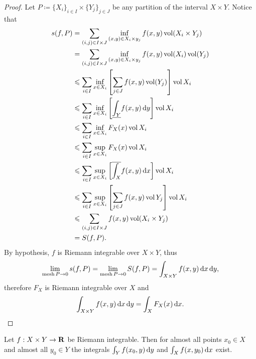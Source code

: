 \begin{proof}
    Let \(P \coloneq \{X_{i}\}_{i \in I} \times \{Y_{j}\}_{j \in J}\) be any
    partition of the interval \(X \times Y\). Notice that
    \begin{align*}
        s(f, P)
         & = \sum_{(i, j) \in I \times J}
        \inf_{(x, y) \in X_i \times y_j}f(x, y) \operatorname{vol}(X_i \times Y_j)                     \\
         & = \sum_{(i, j) \in I \times J}
        \inf_{(x, y) \in X_i \times y_j}f(x, y) \operatorname{vol}(X_i) \operatorname{vol}(Y_j)                      \\
         & \leqslant \sum_{i \in I}
        \inf_{x \in X_i} \left[ \sum_{j \in J} f(x, y) \operatorname{vol}(Y_j) \right] \operatorname{vol} X_i        \\
         & \leqslant \sum_{i \in I} \inf_{x \in X_i} \left[ \underline{\int_{Y}} f(x, y)\,
        \mathrm{d} y \right] \operatorname{vol} X_i                                                         \\
         & \leqslant \sum_{i \in I} \inf_{x \in X_i} F_X(x) \operatorname{vol} X_i                          \\
         & \leqslant \sum_{i \in I} \sup_{x \in X_i} F_X(x) \operatorname{vol} X_i                          \\
         & \leqslant \sum_{i \in I} \sup_{x \in X_i} \left[ \overline{\int_X} f(x, y)\, \mathrm{d}
        x \right] \operatorname{vol} X_i                                                               \\
         & \leqslant \sum_{i \in I} \sup_{x \in X_i} \left[ \sum_{j \in J} f(x, y) \operatorname{vol} Y_j
        \right] \operatorname{vol} X_i                                                                 \\
         & \leqslant \sum_{(i, j) \in I \times J} f(x, y) \operatorname{vol}(X_i \times Y_j)                \\
         & = S(f, P).
    \end{align*}
    By hypothesis, \(f\) is Riemann integrable over \(X \times Y\), thus
    \[
        \lim_{\operatorname{mesh} P \to 0} s(f, P)
        = \lim_{\operatorname{mesh} P \to 0} S(f, P)
        = \int_{X \times Y} f(x, y)\, \mathrm{d} x\, \mathrm{d} y,
    \]
    therefore \(F_X\) is Riemann integrable over
    \(X\) and
    \[
        \int_{X \times Y} f(x, y)\, \mathrm{d} x\, \mathrm{d} y = \int_X F_X(x)\, \mathrm{d} x.
    \]
\end{proof}

\begin{corollary}
    \label{cor:riemann-int-XxY-almost-int-X-and-Y}
    Let \(f: X \times Y \to \mathbf{R}\) be Riemann integrable. Then for almost all points
    \(x_0 \in X\) and almost all \(y_0 \in Y\) the integrals \(\int_Y f(x_0, y)\,
    \mathrm{d} y\) and \(\int_X f(x, y_0)\, \mathrm{d} x\) exist.
\end{corollary}

